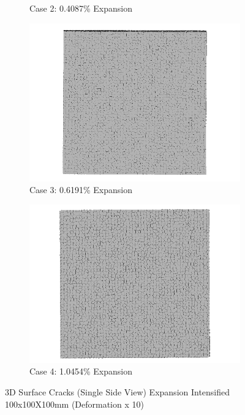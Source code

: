 \begin{figure}[ht!]
\begin{subfigure}{.5\textwidth}
    \caption{Case 2: 0.4087\% Expansion}
    \end{subfigure}%
    \begin{subfigure}{.5\textwidth}
      \centering
      \includegraphics[width=.8\linewidth]{Files/exp_3D/DEF/A30X-1C_3_3ds.png}
    \caption{Case 3: 0.6191\% Expansion}
    \end{subfigure}
    \begin{subfigure}{.5\textwidth}
      \centering
      \includegraphics[width=.8\linewidth]{Files/exp_3D/DEF/A30X-1C_4_3ds.png}
    \caption{Case 4: 1.0454\% Expansion}
    \end{subfigure}%

  \caption{3D Surface Cracks (Single Side View) Expansion Intensified 100x100X100mm (Deformation x 10)}
  \label{fig:DEF_A30X-1C_3DS}
\end{figure}

